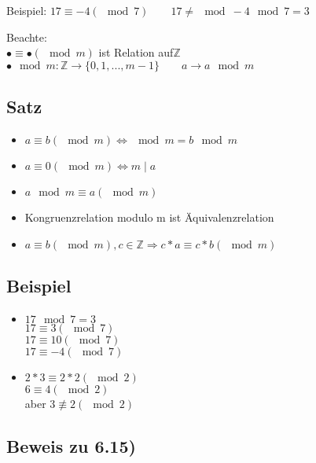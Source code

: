 \documentclass[a4paper, 12pt, twoside] {article}
\begin{document}
Beispiel: $17 \equiv -4 (\mod 7) \qquad 17 \neq \mod -4 \mod 7 = 3$

Beachte: \\
$\bullet \equiv \bullet (\mod m)$ ist Relation auf$ \mathbb{Z}$ \\
$\bullet \mod m : \mathbb{Z} \rightarrow \{0, 1, ..., m-1\} \qquad a \rightarrow a \mod m$


\subsection{Satz} %
\begin{itemize}

\item $a \equiv b (\mod m) \Leftrightarrow \mod m = b \mod m$
\item $a \equiv 0 (\mod m) \Leftrightarrow m \mid a$
\item $a \mod m \equiv a (\mod m)$
\item Kongruenzrelation modulo m ist Äquivalenzrelation
\item $a \equiv b (\mod m) , c \in \mathbb{Z} \Rightarrow c*a \equiv c*b (\mod m)$

\end{itemize}

\subsection{Beispiel} %
\begin{itemize}

\item $17 \mod 7 = 3$ \\
$17 \equiv 3 (\mod 7)$ \\
$17 \equiv 10 (\mod 7)$ \\
$17 \equiv -4 (\mod 7)$

\item $2*3 \equiv 2*2 (\mod 2)$ \\
$6 \equiv 4 (\mod 2)$ \\
aber $3 \not\equiv 2 (\mod 2)$

\end{itemize}

\subsection*{Beweis zu 6.15)}
\end{document}
